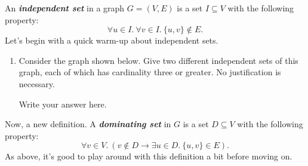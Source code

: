 \documentclass{article}
\renewcommand{\(}{\left(}
\renewcommand{\)}{\right)}
\theoremstyle{plain}
\theoremstyle{plain}
\theoremstyle{definition}
\renewcommand{\emph}[1]{\textit{\textbf{#1}}}
\begin{document}
An \emph{independent set} in a graph $G = (V, E)$ is a set $I \subseteq V$ with
the following property:
$$
  \forall u \in I.\ \forall v \in I.\ \{u, v\} \not\in E.
$$
Let's begin with a quick warm-up about independent sets.

\begin{enumerate}[label=\roman*.,ref=\roman*,topsep=0pt]
  \item Consider the graph shown below. Give two different independent sets of
    this graph, each of which has cardinality three or greater. No
    justification is necessary.

    \begin{center}
    \begin{minipage}{0.5\textwidth}
    \end{minipage}
    \end{center}

    \begin{shaded}
      Write your answer here.
    \end{shaded}
\end{enumerate}

Now, a new definition. A \emph{dominating set} in $G$ is a set $D \subseteq V$
with the following property:
$$
  \forall v \in V.\ (v \not\in D \rightarrow \exists u \in D.\ \{u, v\} \in E).
$$
As above, it's good to play around with this definition a bit before moving on.
\end{document}
